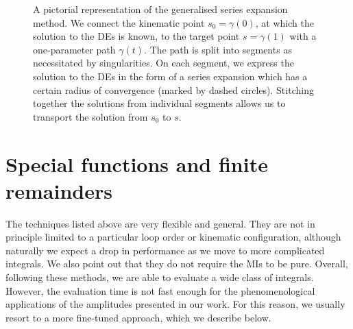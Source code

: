\documentclass[main.tex]{subfiles}
\begin{document}
\begin{figure}
    \centering
    \caption{A pictorial representation of the generalised series expansion method. We connect the kinematic point $s_0 = \gamma(0)$, at which the solution to the DEs is known, to the target point $s = \gamma(1)$ with a one-parameter path $\gamma(t)$. The path is split into segments as necessitated by singularities. On each segment, we express the solution to the DEs in the form of a series expansion which has a certain radius of convergence (marked by dashed circles). Stitching together the solutions from individual segments allows us to transport the solution from $s_0$ to $s$.}
    \label{fig:seriesexp}
\end{figure}
\section{Special functions and finite remainders} \label{sec:specialfunctions}
The techniques listed above are very flexible and general. They are not in principle limited to a particular loop order or kinematic configuration, although naturally we expect a drop in performance as we move to more complicated integrals. We also point out that they do not require the MIs to be pure. Overall, following these methods, we are able to evaluate a wide class of integrals. However, the evaluation time is not fast enough for the phenomenological applications of the amplitudes presented in our work. For this reason, we usually resort to a more fine-tuned approach, which we describe below. 
\end{document}
